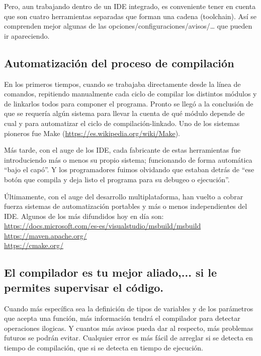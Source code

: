 \documentclass[spanish,12pt,a4paper,final,oneside]{book}
\begin{document}
Pero, aun trabajando dentro de un IDE integrado, es conveniente tener en cuenta que son cuatro herramientas separadas que forman una cadena (toolchain). Así se comprenden mejor algunas de las  opciones/configuraciones/avisos/… que pueden ir apareciendo.



\subsection{Automatización del proceso de compilación}
En los primeros tiempos, cuando se trabajaba directamente desde la línea de comandos, repitiendo manualmente cada ciclo de compilar los distintos módulos y de linkarlos todos para componer el programa. Pronto se llegó a la conclusión de que se requería algún sistema para llevar la cuenta de qué módulo depende de cual y para automatizar el ciclo de compilación-linkado. Uno de los sistemas pioneros fue Make (\url{https://es.wikipedia.org/wiki/Make}). 

Más tarde, con el auge de los IDE, cada fabricante de estas herramientas fue introduciendo más o menos su propio sistema; funcionando de forma automática ``bajo el capó''. Y los programadores fuimos olvidando que estaban detrás de ``ese botón que compila y deja listo el programa para su debugeo o ejecución''.

Últimamente, con el auge del desarrollo multiplataforma, han vuelto a cobrar fuerza sistemas de automatización portables y más o menos independientes del IDE. Algunos de los más difundidos hoy en día son:
\\ \url{https://docs.microsoft.com/es-es/visualstudio/msbuild/msbuild}
\\ \url{https://maven.apache.org/}
\\ \url{https://cmake.org/}



\subsection{El compilador es tu mejor aliado,... si le permites supervisar el código.} 
Cuando más específica sea la definición de tipos de variables y de los parámetros que acepta una función, más información tendrá el compilador para detectar operaciones ilogicas. Y cuantos más avisos pueda dar al respecto, más problemas futuros se podrán evitar. Cualquier error es más fácil de arreglar si se detecta en tiempo de compilación, que si se detecta en tiempo de ejecución.
\end{document}
